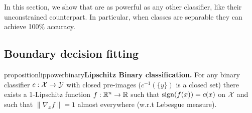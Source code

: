 In this section, we show that \LipCl are as powerful as any other classifier, like their unconstrained counterpart. In particular, when classes are separable they can achieve 100\% accuracy. %

\subsection{Boundary decision fitting}

    \begin{restatable}{proposition}{lippowerbinary}{\normalfont\textbf{Lipschitz Binary classification.}}\label{thm:lippowerbinary}
        For any binary classifier $c:\mathcal{X}\rightarrow\mathcal{Y}$ with closed pre-images ($c^{-1}(\{y\})$ is a closed set) there exists a 1-Lipschitz function $f:\mathbb{R}^n\rightarrow\mathbb{R}$ such that $\text{sign}{(f(x))}=c(x)$ on $\mathcal{X}$ and such that $\|\nabla_x f\|=1$ almost everywhere (w.r.t Lebesgue measure). 
    \end{restatable} %
    
      
